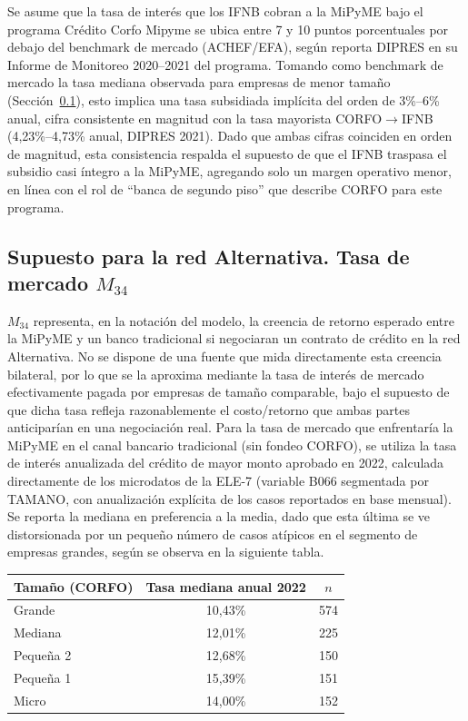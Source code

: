 Se asume que la tasa de interés que los IFNB cobran a la MiPyME bajo el programa Crédito Corfo Mipyme se ubica entre 7 y 10 puntos porcentuales por debajo del benchmark de mercado (ACHEF/EFA), según reporta DIPRES en su Informe de Monitoreo 2020--2021 del programa. Tomando como benchmark de mercado la tasa mediana observada para empresas de menor tamaño (Sección~\ref{sec:tasa-mercado}), esto implica una tasa subsidiada implícita del orden de 3\%--6\% anual, cifra consistente en magnitud con la tasa mayorista CORFO$\to$IFNB (4,23\%--4,73\% anual, DIPRES 2021). Dado que ambas cifras coinciden en orden de magnitud, esta consistencia respalda el supuesto de que el IFNB traspasa el subsidio casi íntegro a la MiPyME, agregando solo un margen operativo menor, en línea con el rol de ``banca de segundo piso'' que describe CORFO para este programa.

\subsection[Supuesto para la red Alternativa. Tasa de mercado M34]{Supuesto para la red Alternativa. Tasa de mercado $M_{34}$}
\label{sec:tasa-mercado}

$M_{34}$ representa, en la notación del modelo, la creencia de retorno esperado entre la MiPyME y un banco tradicional si negociaran un contrato de crédito en la red Alternativa. No se dispone de una fuente que mida directamente esta creencia bilateral, por lo que se la aproxima mediante la tasa de interés de mercado efectivamente pagada por empresas de tamaño comparable, bajo el supuesto de que dicha tasa refleja razonablemente el costo/retorno que ambas partes anticiparían en una negociación real. Para la tasa de mercado que enfrentaría la MiPyME en el canal bancario tradicional (sin fondeo CORFO), se utiliza la tasa de interés anualizada del crédito de mayor monto aprobado en 2022, calculada directamente de los microdatos de la ELE-7 (variable B066 segmentada por TAMANO, con anualización explícita de los casos reportados en base mensual). Se reporta la mediana en preferencia a la media, dado que esta última se ve distorsionada por un pequeño número de casos atípicos en el segmento de empresas grandes, según se observa en la siguiente tabla.

\begin{center}
\begin{tabular}{lcc}
\hline
Tamaño (CORFO) & Tasa mediana anual 2022 & $n$ \\
\hline
Grande      & 10,43\% & 574 \\
Mediana     & 12,01\% & 225 \\
Pequeña 2   & 12,68\% & 150 \\
Pequeña 1   & 15,39\% & 151 \\
Micro       & 14,00\% & 152 \\
\hline
\end{tabular}
\end{center}

